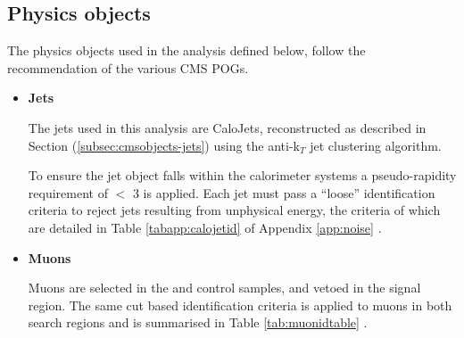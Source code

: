 \subsection{Physics objects}
\label{subsec:physicsobjects}

The physics objects used in the analysis defined below, follow the recommendation of the various \ac{CMS} \acf{POGs}. 

\begin{itemize}

\item \textbf{Jets}

The jets used in this analysis are CaloJets, reconstructed as described in Section (\ref{subsec:cmsobjects-jets}) using the anti-k$_{T}$ jet clustering algorithm. 

To ensure the jet object falls within the calorimeter systems a pseudo-rapidity requirement of \abeta $<$ 3 is applied. Each jet must pass a ``loose'' identification criteria to reject jets resulting from unphysical energy, the criteria of which are detailed in Table \ref{tabapp:calojetid} of Appendix \ref{app:noise}  \cite{CMS-PAS-JME-09-008}.

\item \textbf{Muons}

Muons are selected in the \mupjets and \dimupjets control samples, and vetoed in the signal region. The same cut based identification criteria is applied to muons in both search regions and is summarised in Table \ref{tab:muonidtable} \cite{1748-0221-7-10-P10002}.


\end{itemize}
